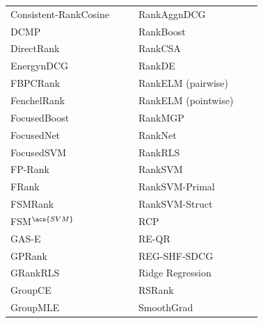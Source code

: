 \begin{table}[!h]
{\begin{tabular}{|l|l|l||l|l|l|}
Consistent-RankCosine & \cite{Ravikumar2011} & \cite{Tan2013} & RankAgg\acs{nDCG} & \cite{Wang2013} & \cite{Wang2013} \\ 
DCMP & \cite{Renjifo2012}  & \cite{Renjifo2012}  & RankBoost & \cite{Freund2003} & \cite{Busa-Fekete2013} \\ 
DirectRank & \cite{Tan2013} & \cite{Tan2013} & RankCSA & \cite{He2010} & \cite{He2010} \\ 
Energy\acs{nDCG} & \cite{Freno2011} & \cite{Freno2011} & RankDE & \cite{Bollegala2011} & \cite{Sato2013} \\ 
FBPCRank & \cite{Lai2011} & \cite{Lai2011} & RankELM (pairwise) & \cite{Zong2013} & \cite{Zong2013} \\ 
FenchelRank & \cite{Lai2013} & \cite{Lai2013, Lai2013b, Laporte2013} & RankELM (pointwise) & \cite{Zong2013} & \cite{Zong2013} \\ 
FocusedBoost & \cite{Niu2012} & \cite{Niu2012} & RankMGP & \cite{Lin2012} & \cite{Lin2012} \\ 
FocusedNet & \cite{Niu2012} & \cite{Niu2012} & RankNet & \cite{Burges2005} & \cite{Busa-Fekete2013, Papini2012, Niu2012} \\ 
Focused\acs{SVM} & \cite{Niu2012} & \cite{Niu2012} & Rank\acs{RLS} & \cite{Pahikkala2009} & \cite{Pahikkala2010} \\ 
FP-Rank & \cite{Song2013} & \cite{Song2013} & Rank\acs{SVM} & \cite{Herbrich1999, Joachims2002} & \cite{Busa-Fekete2013, Freno2011, He2010} \\ 
FRank & \cite{Tsai2007} & \cite{Wang2012} & Rank\acs{SVM}-Primal &  & \cite{Lai2011} \\ 
FSMRank & \cite{Lai2013c} & \cite{Lai2013c,Laporte2013} & Rank\acs{SVM}-Struct &  &  \\
FSM$^{\acs{SVM}}$ & \cite{Lai2013c} & \cite{Lai2013c} & RCP & \cite{Elsas2008} & \cite{Elsas2008} \\ 
GAS-E & \cite{Geng2007} & \cite{Lai2013c} & RE-QR & \cite{Veloso2010} & \cite{Veloso2010} \\ 
\acs{GP}Rank & \cite{Silva2009} & \cite{Torkestani2012} & REG-SHF-SDCG & \cite{Wu2009} & \cite{Wu2009} \\ 
GRank\acs{RLS} & \cite{Pahikkala2010} & \cite{Pahikkala2010} & Ridge Regression & \cite{Cossock2006} &  \\ 
Group\acs{CE} & \cite{Lin2011} & \cite{Lin2011} & RSRank & \cite{Sun2009} & \cite{Lai2013} \\ 
Group\acs{MLE} & \cite{Lin2010} & \cite{Lin2011} & SmoothGrad & \cite{Le2007} & \cite{Tan2013} \\ 

\end{tabular}}
\end{table}
